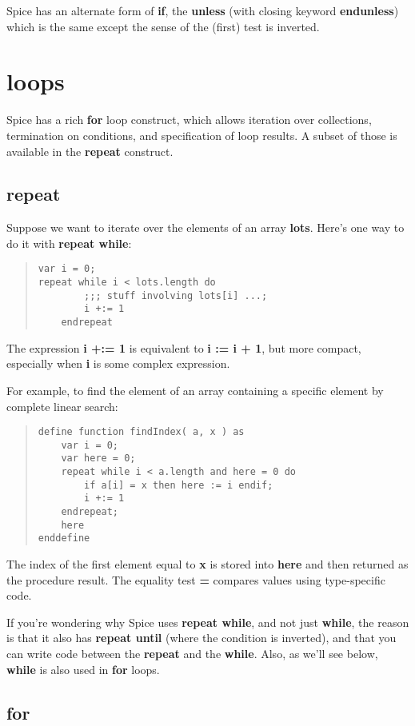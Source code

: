 \documentclass{report}
\begin{document}
Spice has an alternate form of {\bf if}, the {\bf unless} (with closing keyword
{\bf endunless}) which is the same except the sense of the (first) test is
inverted.\chapter{loops}


Spice has a rich {\bf for} loop construct, which allows iteration over
collections, termination on conditions, and specification of loop results.
A subset of those is available in the {\bf repeat} construct.

\section{repeat}


Suppose we want to iterate over the elements of an array {\bf lots}.
Here's one way to do it with {\bf repeat while}:

\begin{quote}
\begin{verbatim}
var i = 0;
repeat while i < lots.length do
        ;;; stuff involving lots[i] ...;
        i +:= 1
    endrepeat
\end{verbatim}
\end{quote}
The expression {\bf i +:= 1} is equivalent to {\bf i := i + 1}, but more compact,
especially when {\bf i} is some complex expression.

For example, to find the element of an array containing a specific element by
complete linear search:

\begin{quote}
\begin{verbatim}
define function findIndex( a, x ) as
    var i = 0;
    var here = 0;
    repeat while i < a.length and here = 0 do
        if a[i] = x then here := i endif;
        i +:= 1
    endrepeat;
    here
enddefine
\end{verbatim}
\end{quote}
The index of the first element equal to {\bf x} is stored into {\bf here} and then
returned as the procedure result. The equality test {\bf =} compares values
using type-specific code.

If you're wondering why Spice uses {\bf repeat while}, and not just {\bf while}, the
reason is that it also has {\bf repeat until} (where the condition is inverted),
and that you can write code between the {\bf repeat} and the {\bf while}. Also, as
we'll see below, {\bf while} is also used in {\bf for} loops.\section{for}
\end{document}
